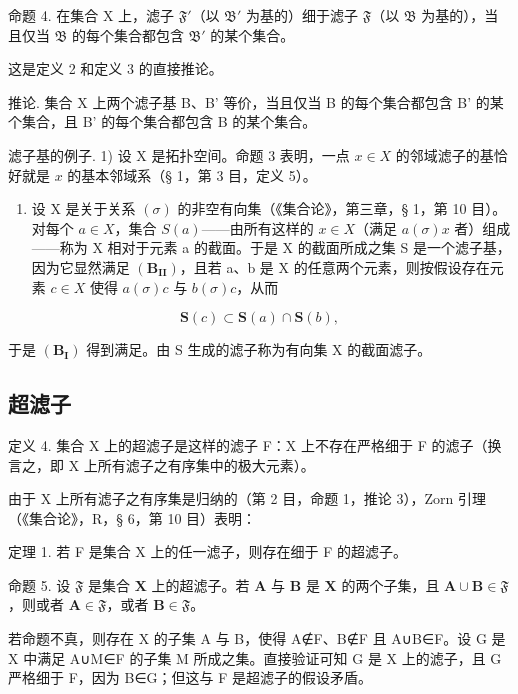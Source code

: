 命题 4. 在集合 X 上，滤子 \(\mathfrak{F}'\)（以 \(\mathfrak{B}'\) 为基的）细于滤子 \(\mathfrak{F}\)（以 \(\mathfrak{B}\) 为基的），当且仅当 \(\mathfrak{B}\) 的每个集合都包含 \(\mathfrak{B}'\) 的某个集合。

这是定义 2 和定义 3 的直接推论。

推论. 集合 X 上两个滤子基 B、B' 等价，当且仅当 B 的每个集合都包含 B' 的某个集合，且 B' 的每个集合都包含 B 的某个集合。

滤子基的例子. 1) 设 X 是拓扑空间。命题 3 表明，一点 \(x \in X\) 的邻域滤子的基恰好就是 \(x\) 的基本邻域系（§ 1，第 3 目，定义 5）。

\begin{enumerate}
\def\labelenumi{\arabic{enumi})}
\setcounter{enumi}{1}
\tightlist
\item
  设 X 是关于关系 \((\sigma)\) 的非空有向集（《集合论》，第三章，§ 1，第 10 目）。对每个 \(a \in X\)，集合 \(S(a)\)——由所有这样的 \(x \in X\)（满足 \(a(\sigma)x\) 者）组成——称为 X 相对于元素 a 的截面。于是 X 的截面所成之集 S 是一个滤子基，因为它显然满足 \((\mathbf{B}_{\mathbf{II}})\)，且若 a、b 是 X 的任意两个元素，则按假设存在元素 \(c \in X\) 使得 \(a(\sigma)c\) 与 \(b(\sigma)c\)，从而
\end{enumerate}

\[
\mathbf {S} (c) \subset \mathbf {S} (a) \cap \mathbf {S} (b),
\]

于是 \((\mathbf{B}_{\mathbf{I}})\) 得到满足。由 S 生成的滤子称为有向集 X 的截面滤子。

\subsection{超滤子}

定义 4. 集合 X 上的超滤子是这样的滤子 F：X 上不存在严格细于 F 的滤子（换言之，即 X 上所有滤子之有序集中的极大元素）。

由于 X 上所有滤子之有序集是归纳的（第 2 目，命题 1，推论 3），Zorn 引理（《集合论》，R，§ 6，第 10 目）表明：

定理 1. 若 F 是集合 X 上的任一滤子，则存在细于 F 的超滤子。

命题 5. 设 \(\mathfrak{F}\) 是集合 \(\mathbf{X}\) 上的超滤子。若 \(\mathbf{A}\) 与 \(\mathbf{B}\) 是 \(\mathbf{X}\) 的两个子集，且 \(\mathbf{A} \cup \mathbf{B} \in \mathfrak{F}\)，则或者 \(\mathbf{A} \in \mathfrak{F}\)，或者 \(\mathbf{B} \in \mathfrak{F}\)。

若命题不真，则存在 X 的子集 A 与 B，使得 A∉F、B∉F 且 A∪B∈F。设 G 是 X 中满足 A∪M∈F 的子集 M 所成之集。直接验证可知 G 是 X 上的滤子，且 G 严格细于 F，因为 B∈G；但这与 F 是超滤子的假设矛盾。

